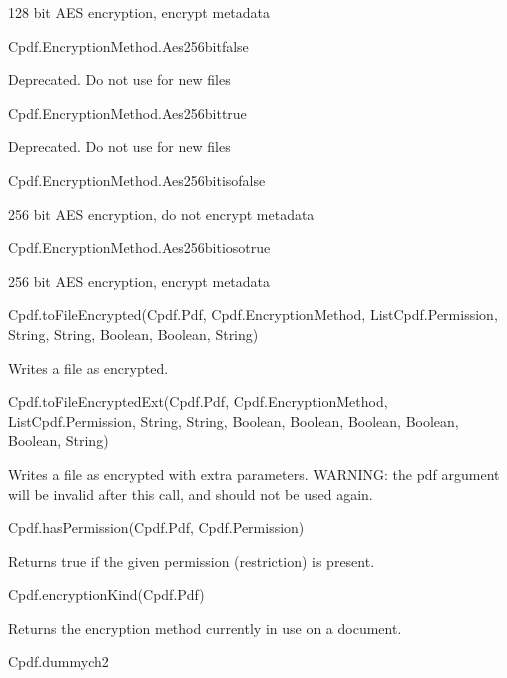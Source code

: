 128 bit AES encryption, encrypt metadata

Cpdf.EncryptionMethod.Aes256bitfalse

Deprecated. Do not use for new files

Cpdf.EncryptionMethod.Aes256bittrue

Deprecated. Do not use for new files

Cpdf.EncryptionMethod.Aes256bitisofalse

256 bit AES encryption, do not encrypt metadata

Cpdf.EncryptionMethod.Aes256bitiosotrue

256 bit AES encryption, encrypt metadata

Cpdf.toFileEncrypted(Cpdf.Pdf, Cpdf.EncryptionMethod, List{Cpdf.Permission}, String, String, Boolean, Boolean, String)


Writes a file as encrypted.


Cpdf.toFileEncryptedExt(Cpdf.Pdf, Cpdf.EncryptionMethod, List{Cpdf.Permission}, String, String, Boolean, Boolean, Boolean, Boolean, Boolean, String)


Writes a file as encrypted with extra parameters. WARNING: the
pdf argument will be invalid after this call, and should not be used again.


Cpdf.hasPermission(Cpdf.Pdf, Cpdf.Permission)


Returns true if the given permission
(restriction) is present.


Cpdf.encryptionKind(Cpdf.Pdf)


Returns the encryption method currently in use on
a document.


Cpdf.dummych2

